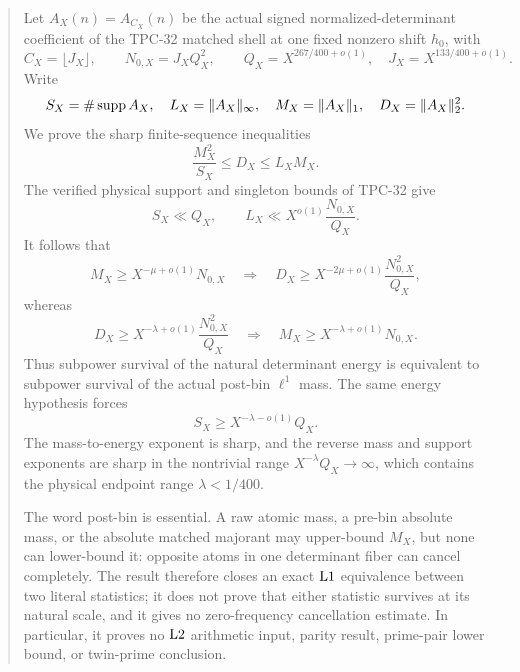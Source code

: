 \begin{abstract}
Let \(A_X(n)=A_{C_X}(n)\) be the actual signed
normalized-determinant coefficient of the TPC-32 matched shell at one
fixed nonzero shift \(h_0\), with
\[
 C_X=\lfloor J_X\rfloor,\qquad
 N_{0,X}=J_XQ_X^2,
\qquad
 Q_X=X^{267/400+o(1)},\quad
 J_X=X^{133/400+o(1)}.
\]
Write
\[
 S_X=\#\supp A_X,\quad
 L_X=\|A_X\|_\infty,\quad
 M_X=\|A_X\|_1,\quad
 D_X=\|A_X\|_2^2.
\]
We prove the sharp finite-sequence inequalities
\[
 \frac{M_X^2}{S_X}\le D_X\le L_XM_X.
\]
The verified physical support and singleton bounds of TPC-32 give
\[
 S_X\ll Q_X,\qquad
 L_X\ll X^{o(1)}\frac{N_{0,X}}{Q_X}.
\]
It follows that
\[
 M_X\ge X^{-\mu+o(1)}N_{0,X}
 \quad\Longrightarrow\quad
 D_X\ge X^{-2\mu+o(1)}
 \frac{N_{0,X}^2}{Q_X},
\]
whereas
\[
 D_X\ge X^{-\lambda+o(1)}
 \frac{N_{0,X}^2}{Q_X}
 \quad\Longrightarrow\quad
 M_X\ge X^{-\lambda+o(1)}N_{0,X}.
\]
Thus subpower survival of the natural determinant energy is
equivalent to subpower survival of the actual post-bin
\(\ell^1\) mass.  The same energy hypothesis forces
\[
 S_X\ge X^{-\lambda-o(1)}Q_X.
\]
The mass-to-energy exponent is sharp, and the reverse mass and
support exponents are sharp in the nontrivial range
\(X^{-\lambda}Q_X\to\infty\), which contains the physical endpoint
range \(\lambda<1/400\).

The word post-bin is essential.  A raw atomic mass, a pre-bin
absolute mass, or the absolute matched majorant may upper-bound
\(M_X\), but none can lower-bound it: opposite atoms in one
determinant fiber can cancel completely.  The result therefore closes
an exact \(\Lone\) equivalence between two literal statistics; it
does not prove that either statistic survives at its natural scale,
and it gives no zero-frequency cancellation estimate.  In
particular, it proves no \(\Ltwo\) arithmetic input, parity result,
prime-pair lower bound, or twin-prime conclusion.
\end{abstract}
